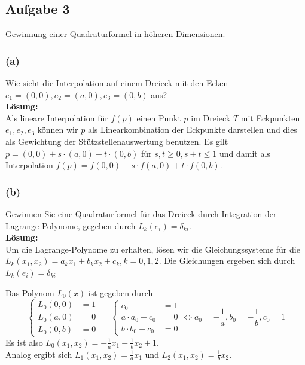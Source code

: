 \documentclass[11pt,a4paper,ngerman]{article}
\begin{document}
\subsection*{Aufgabe 3}

Gewinnung einer Quadraturformel in höheren Dimensionen.

\subsubsection*{(a)}
Wie sieht die Interpolation auf einem Dreieck mit den Ecken $e_1 = (0,0), e_2 = (a,0), e_3 = (0,b)$ aus?\\

\textbf{Lösung:}\\
Als lineare Interpolation für $f(p)$ einen Punkt $p$ im Dreieck $T$ mit Eckpunkten $e_1, e_2, e_3$ können wir
$p$ als Linearkombination der Eckpunkte darstellen und dies als Gewichtung der Stützstellenauswertung benutzen.
Es gilt $p = (0,0) + s \cdot (a,0) + t \cdot (0,b)$ für $s,t \geq 0, s + t \leq 1$ und damit als Interpolation
$f(p) = f(0,0) + s \cdot f(a,0) + t \cdot f(0,b)$.

\subsubsection*{(b)}
Gewinnen Sie eine Quadraturformel für das Dreieck durch Integration der Lagrange-Polynome, gegeben
durch $L_k(e_i) = \delta_{ki}$.\\

\textbf{Lösung:}\\
Um die Lagrange-Polynome zu erhalten, lösen wir die Gleichungssysteme für die $L_k(x_1,x_2) = a_k x_1 + b_k x_2 + c_k, k = 0,1,2$. Die Gleichungen ergeben sich durch $L_k(e_i) = \delta_{ki}$

Das Polynom $L_0(x)$ ist gegeben durch
\begin{equation*}
\begin{cases}
  L_0(0,0) &= 1 \\
  L_0(a,0) &= 0 \\
  L_0(0,b) &= 0
\end{cases}
= \begin{cases}
  c_0 &= 1 \\
  a \cdot a_0 + c_0 &= 0 \\
  b\cdot b_0 + c_0 &= 0
\end{cases}
\Leftrightarrow
a_0 = -\frac{1}{a}, b_0 = -\frac{1}{b}, c_0 = 1
\end{equation*}
Es ist also $L_0(x_1,x_2) = -\frac{1}{a} x_1 -\frac{1}{b}x_2 + 1$. \\
Analog ergibt sich $L_1(x_1,x_2) = \frac{1}{a} x_1$ und $L_2(x_1,x_2) = \frac{1}{b}x_2$.
%
\end{document}
